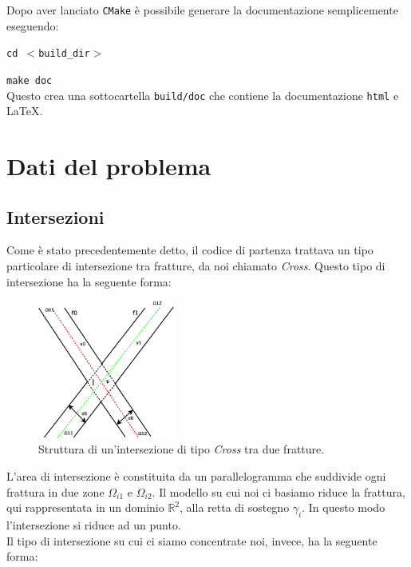 \noindent Dopo aver lanciato \texttt{CMake} è possibile generare la documentazione semplicemente eseguendo: \\
\par \texttt{cd $<$build\_dir$>$} 
\par \texttt{make doc} \\

\noindent Questo crea una sottocartella \texttt{build/doc} che contiene la documentazione \texttt{html} e \LaTeX{}.

\newpage

\section{Dati del problema}

\subsection{Intersezioni}
Come è stato precedentemente detto, il codice di partenza trattava un tipo particolare di intersezione tra fratture, da noi chiamato \textit{Cross}. Questo tipo di intersezione ha la seguente forma:

\begin{figure}[htbp]
\begin{center}
\includegraphics[width=0.4\textwidth]{img/cap2/cross.eps}
\caption{Struttura di un'intersezione di tipo \textit{Cross} tra due fratture.}\label{Cross}
\end{center}
\end{figure}

\noindent L'area di intersezione è constituita da un parallelogramma che suddivide ogni frattura in due zone $\Omega_{i1}$ e $\Omega_{i2}$. Il modello su cui noi ci basiamo riduce la frattura, qui rappresentata in un dominio $\mathbb{R}^{2}$, alla retta di sostegno $\gamma_i$. In questo modo l'intersezione si riduce ad un punto.\\
Il tipo di intersezione su cui ci siamo concentrate noi, invece, ha la seguente forma:

